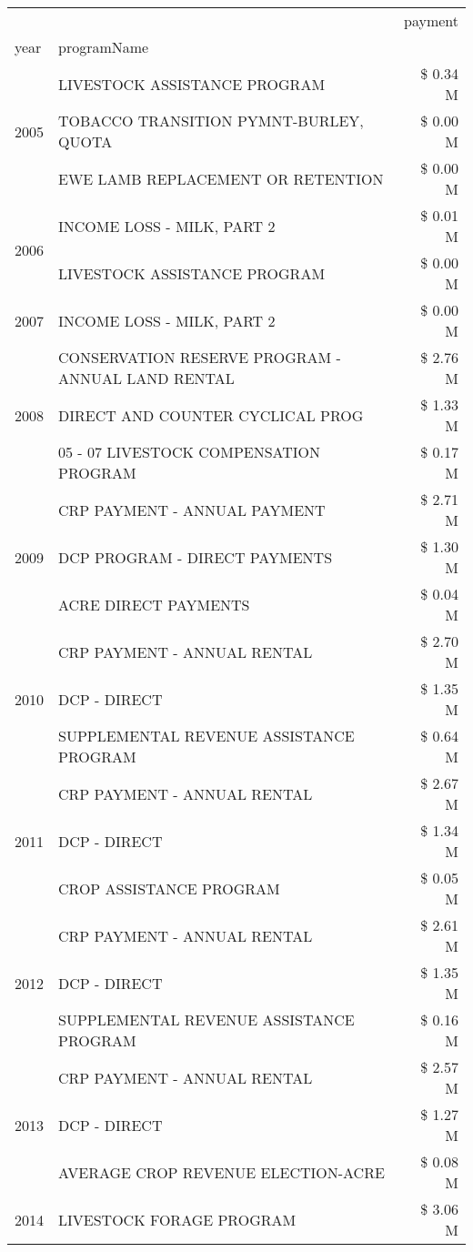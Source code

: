 \begin{tabular}{llr}
\toprule
 &  & payment \\
year & programName &  \\
\midrule
\multirow[t]{3}{*}{2005} & LIVESTOCK ASSISTANCE PROGRAM & \$ 0.34 M \\
 & TOBACCO TRANSITION PYMNT-BURLEY, QUOTA & \$ 0.00 M \\
 & EWE LAMB REPLACEMENT OR RETENTION & \$ 0.00 M \\
\cline{1-3}
\multirow[t]{2}{*}{2006} & INCOME LOSS - MILK, PART 2 & \$ 0.01 M \\
 & LIVESTOCK ASSISTANCE PROGRAM & \$ 0.00 M \\
\cline{1-3}
2007 & INCOME LOSS - MILK, PART 2 & \$ 0.00 M \\
\cline{1-3}
\multirow[t]{3}{*}{2008} & CONSERVATION RESERVE PROGRAM - ANNUAL LAND RENTAL & \$ 2.76 M \\
 & DIRECT AND COUNTER CYCLICAL PROG & \$ 1.33 M \\
 & 05 - 07 LIVESTOCK COMPENSATION PROGRAM & \$ 0.17 M \\
\cline{1-3}
\multirow[t]{3}{*}{2009} & CRP PAYMENT - ANNUAL PAYMENT & \$ 2.71 M \\
 & DCP PROGRAM - DIRECT PAYMENTS & \$ 1.30 M \\
 & ACRE DIRECT PAYMENTS & \$ 0.04 M \\
\cline{1-3}
\multirow[t]{3}{*}{2010} & CRP PAYMENT - ANNUAL RENTAL & \$ 2.70 M \\
 & DCP - DIRECT & \$ 1.35 M \\
 & SUPPLEMENTAL REVENUE ASSISTANCE PROGRAM & \$ 0.64 M \\
\cline{1-3}
\multirow[t]{3}{*}{2011} & CRP PAYMENT - ANNUAL RENTAL & \$ 2.67 M \\
 & DCP - DIRECT & \$ 1.34 M \\
 & CROP ASSISTANCE PROGRAM & \$ 0.05 M \\
\cline{1-3}
\multirow[t]{3}{*}{2012} & CRP PAYMENT - ANNUAL RENTAL & \$ 2.61 M \\
 & DCP - DIRECT & \$ 1.35 M \\
 & SUPPLEMENTAL REVENUE ASSISTANCE PROGRAM & \$ 0.16 M \\
\cline{1-3}
\multirow[t]{3}{*}{2013} & CRP PAYMENT - ANNUAL RENTAL & \$ 2.57 M \\
 & DCP - DIRECT & \$ 1.27 M \\
 & AVERAGE CROP REVENUE ELECTION-ACRE & \$ 0.08 M \\
\cline{1-3}
\multirow[t]{3}{*}{2014} & LIVESTOCK FORAGE PROGRAM & \$ 3.06 M \\

\end{tabular}
